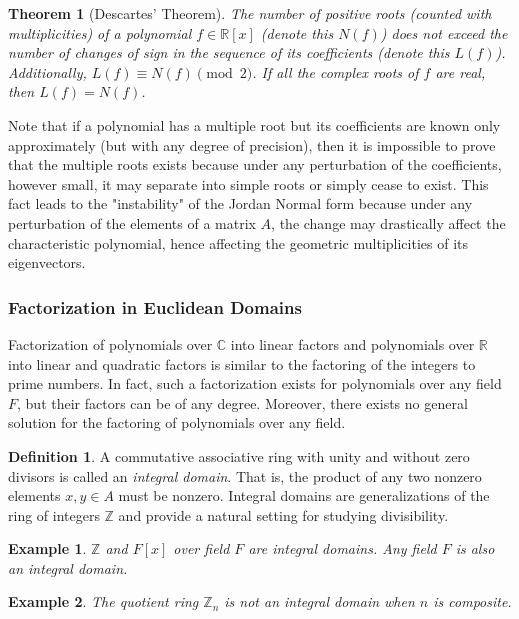 \documentclass{article}
\newtheorem{theorem}{Theorem}[section]
\newtheorem{example}{Example}[section]
\theoremstyle{remark}
\theoremstyle{definition}
\newtheorem{definition}{Definition}[section]
\begin{document}
\begin{theorem}[Descartes' Theorem]
The number of positive roots (counted with multiplicities) of a polynomial $f \in \mathbb{R}[x]$ (denote this $N(f)$) does not exceed the number of changes of sign in the sequence of its coefficients (denote this $L(f)$). Additionally, $L(f) \equiv N(f) \pmod{2}$. If all the complex roots of $f$ are real, then $L(f) = N(f)$. 
\end{theorem}

Note that if a polynomial has a multiple root but its coefficients are known only approximately (but with any degree of precision), then it is impossible to prove that the multiple roots exists because under any perturbation of the coefficients, however small, it may separate into simple roots or simply cease to exist. This fact leads to the "instability" of the Jordan Normal form because under any perturbation of the elements of a matrix $A$, the change may drastically affect the characteristic polynomial, hence affecting the geometric multiplicities of its eigenvectors. 

\subsubsection{Factorization in Euclidean Domains}
Factorization of polynomials over $\mathbb{C}$ into linear factors and polynomials over $\mathbb{R}$ into linear and quadratic factors is similar to the factoring of the integers to prime numbers. In fact, such a factorization exists for polynomials over any field $F$, but their factors can be of any degree. Moreover, there exists no general solution for the factoring of polynomials over any field. 

\begin{definition}
A commutative associative ring with unity and without zero divisors is called an \textit{integral domain}. That is, the product of any two nonzero elements $x, y \in A$ must be nonzero. Integral domains are generalizations of the ring of integers $\mathbb{Z}$ and provide a natural setting for studying divisibility. 
\end{definition}

\begin{example}
$\mathbb{Z}$ and $F[x]$ over field $F$ are integral domains. Any field $F$ is also an integral domain. 
\end{example}

\begin{example}
The quotient ring $\mathbb{Z}_n$ is not an integral domain when $n$ is composite. 
\end{example}
\end{document}
